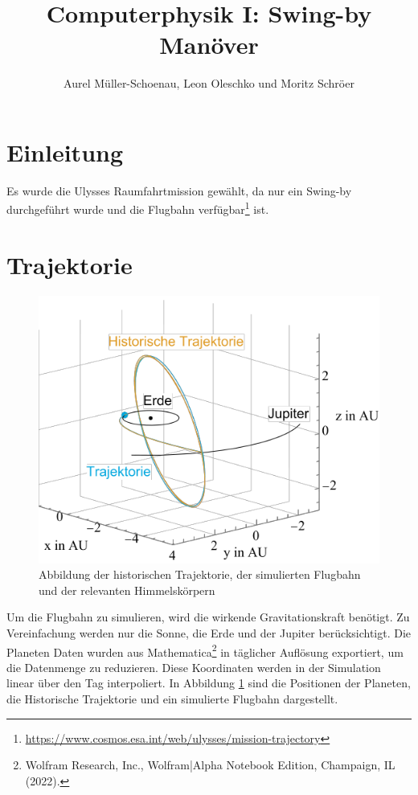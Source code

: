 





\title{Computerphysik I: Swing-by Manöver}
\author{Aurel Müller-Schoenau, Leon Oleschko und Moritz Schröer}
\maketitle

\begin{abstract}	
\end{abstract}

\section{Einleitung}
Es wurde die Ulysses Raumfahrtmission gewählt, da nur ein Swing-by durchgeführt wurde und die Flugbahn verfügbar\footnote{\url{https://www.cosmos.esa.int/web/ulysses/mission-trajectory}} ist.	

\section{Trajektorie}
\begin{figure}[h!]
	\centering
	\includegraphics{img/trajectory.pdf}
	\caption{Abbildung der historischen Trajektorie, der simulierten Flugbahn und der relevanten Himmelskörpern}
	\label{fig:trajectory}
\end{figure}

Um die Flugbahn zu simulieren, wird die wirkende Gravitationskraft benötigt.
Zu Vereinfachung werden nur die Sonne, die Erde und der Jupiter berücksichtigt.
Die Planeten Daten wurden aus Mathematica\footnote{Wolfram Research, Inc., Wolfram|Alpha Notebook Edition, Champaign, IL (2022).} in täglicher Auflösung exportiert, um die Datenmenge zu reduzieren.
Diese Koordinaten werden in der Simulation linear über den Tag interpoliert.
In Abbildung \ref{fig:trajectory} sind die Positionen der Planeten, die Historische Trajektorie und ein simulierte Flugbahn dargestellt.

